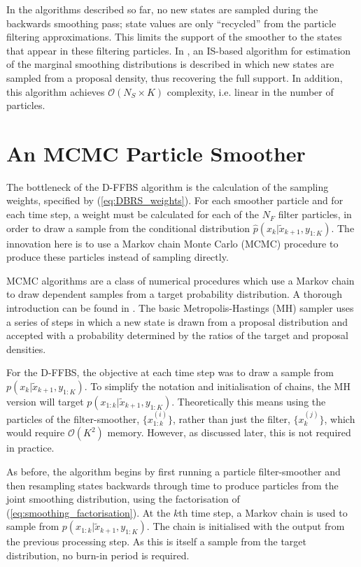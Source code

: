 \documentclass[peerreview,11pt,draftcls,onecolumn]{IEEEtran}
\begin{document}
In the algorithms described so far, no new states are sampled during the backwards smoothing pass; state values are only ``recycled'' from the particle filtering approximations. This limits the support of the smoother to the states that appear in these filtering particles. In \cite{Fearnhead2010}, an IS-based algorithm for estimation of the marginal smoothing distributions is described in which new states are sampled from a proposal density, thus recovering the full support. In addition, this algorithm achieves $\mathcal{O}( N_S \times K)$ complexity, i.e. linear in the number of particles.



\section{An MCMC Particle Smoother} \label{sec:mcmc_smoother}

The bottleneck of the D-FFBS algorithm is the calculation of the sampling weights, specified by (\ref{eq:DBRS_weights}). For each smoother particle and for each time step, a weight must be calculated for each of the $N_F$ filter particles, in order to draw a sample from the conditional distribution $\hat{p}(x_k|\tilde{x}_{k+1}, y_{1:K})$. The innovation here is to use a Markov chain Monte Carlo (MCMC) procedure to produce these particles instead of sampling directly.

MCMC algorithms are a class of numerical procedures which use a Markov chain to draw dependent samples from a target probability distribution. A thorough introduction can be found in \cite{Gilks1996}. The basic Metropolis-Hastings (MH) \cite{Hastings1970} sampler uses a series of steps in which a new state is drawn from a proposal distribution and accepted with a probability determined by the ratios of the target and proposal densities.

For the D-FFBS, the objective at each time step was to draw a sample from $p(x_{k}|\tilde{x}_{k+1}, y_{1:K})$. To simplify the notation and initialisation of chains, the MH version will target $p(x_{1:k}|\tilde{x}_{k+1}, y_{1:K})$. Theoretically this means using the particles of the filter-smoother, $\{x_{1:k}^{(i)}\}$, rather than just the filter, $\{x_k^{(j)}\}$, which would require $\mathcal{O}(K^2)$ memory. However, as discussed later, this is not required in practice.

As before, the algorithm begins by first running a particle filter-smoother and then resampling states backwards through time to produce particles from the joint smoothing distribution, using the factorisation of (\ref{eq:smoothing_factorisation}). At the $k$th time step, a Markov chain is used to sample from $p(x_{1:k}|\tilde{x}_{k+1}, y_{1:K})$. The chain is initialised with the output from the previous processing step. As this is itself a sample from the target distribution, no burn-in period is required.
\end{document}

